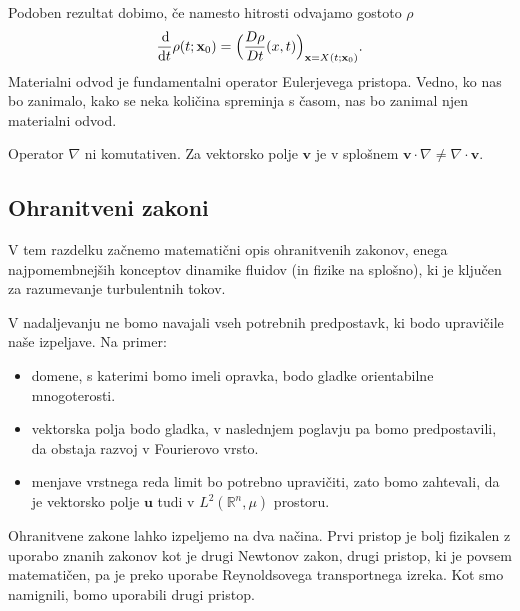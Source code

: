 \documentclass[mat2, tisk]{fmfdelo}
\newcommand{\R}{\mathbb R}
\newcommand{\bd}{\textbf}
\begin{document}
Podoben rezultat dobimo, če namesto hitrosti odvajamo gostoto $\rho$
\begin{equation*}
\frac{\dif }{\dif t} \rho(t; \bd{x}_0) = \Big(\frac{D \rho}{Dt}(x, t) \Big)_{\bd{x} = X(t; \bd{x}_0)}.
\end{equation*}
Materialni odvod je fundamentalni operator Eulerjevega pristopa. Vedno, ko nas bo 
zanimalo, kako se neka količina spreminja s časom, nas bo zanimal njen materialni odvod.

\begin{opomba}
Operator $\nabla$ ni komutativen. Za vektorsko polje $\bd{v}$ je v splošnem $\bd{v} \cdot \nabla \neq \nabla \cdot \bd{v}$.
\end{opomba}


\subsection{Ohranitveni zakoni}
\label{sec:ohranitveni-zakoni}

V tem razdelku začnemo matematični opis ohranitvenih zakonov, enega najpomembnejših konceptov dinamike fluidov (in fizike na splošno), 
ki je ključen za razumevanje turbulentnih tokov. 

\begin{opomba}
V nadaljevanju ne bomo navajali vseh potrebnih predpostavk, ki bodo upravičile naše izpeljave. Na primer:
\begin{itemize}
  \item domene, s katerimi bomo imeli opravka, bodo gladke orientabilne mnogoterosti.
  \item vektorska polja bodo gladka, v naslednjem poglavju pa bomo predpostavili, da 
  obstaja razvoj v Fourierovo vrsto.
  \item menjave vrstnega reda limit bo potrebno upravičiti, zato bomo zahtevali, da je 
  vektorsko polje $\bd{u}$ tudi v $L^2(\R^n, \mu)$ prostoru.
\end{itemize}
\end{opomba}

Ohranitvene zakone lahko izpeljemo na dva načina. Prvi pristop je bolj fizikalen 
z uporabo znanih zakonov kot je drugi Newtonov zakon, drugi pristop, ki je povsem matematičen,
pa je preko uporabe Reynoldsovega transportnega izreka. Kot smo namignili, bomo uporabili drugi 
pristop. 
\end{document}
